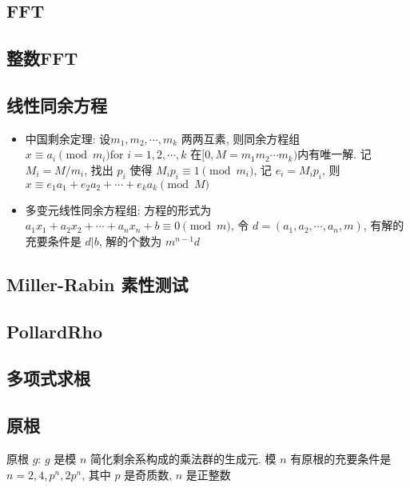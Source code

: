 \documentclass[landscape, twocolumn, 8pt, a4paper, twoside]{extarticle}
\begin{document}
  \subsection{FFT}
    

  \subsection{整数FFT}
    

  \subsection{线性同余方程}
    \begin{itemize}
    \item 中国剩余定理:
      设$m_1, m_2, \cdots, m_k$ 两两互素, 则同余方程组 $x \equiv a_i \pmod{m_i} \textrm{for $i = 1, 2, \cdots, k$}$
      在$[0, M = m_1 m_2 \cdots m_k)$内有唯一解. 
      记 $M_i = M / m_i$,
      找出 $p_i$ 使得 $M_i p_i \equiv 1 \pmod{m_i}$,
      记 $e_i = M_i p_i$,
      则 $x \equiv e_1 a_1 + e_2 a_2 + \cdots + e_k a_k \pmod{M}$
    \item 多变元线性同余方程组:
      方程的形式为 $a_1 x_1 + a_2 x_2 + \cdots + a_n x_n + b \equiv 0 \pmod{m}$,
      令 $d = (a_1, a_2, \cdots, a_n, m)$,
      有解的充要条件是 $d | b$, 解的个数为 $m^{n - 1} d$
    \end{itemize}

  \subsection{Miller-Rabin 素性测试}
    
  
  \subsection{PollardRho}
    

  \subsection{多项式求根}
    
  
  \subsection{原根}
    原根 $g$: $g$ 是模 $n$ 简化剩余系构成的乘法群的生成元.
    模 $n$ 有原根的充要条件是 $n = 2, 4, p^n, 2p^n$, 其中 $p$ 是奇质数, $n$ 是正整数
    
\end{document}
